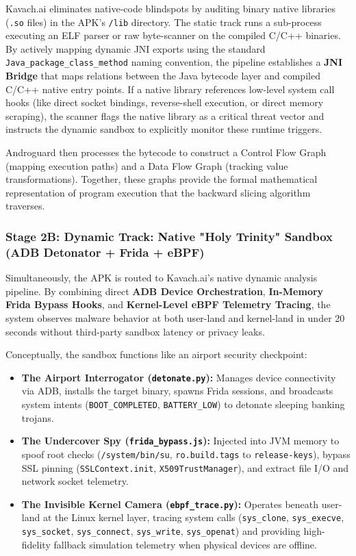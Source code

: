 \documentclass[10pt,a4paper]{article}
\begin{document}
Kavach.ai eliminates native-code blindspots by auditing binary native libraries (\texttt{.so} files) in the APK's \texttt{/lib} directory. The static track runs a sub-process executing an ELF parser or raw byte-scanner on the compiled C/C++ binaries. By actively mapping dynamic JNI exports using the standard \texttt{Java\_package\_class\_method} naming convention, the pipeline establishes a \textbf{JNI Bridge} that maps relations between the Java bytecode layer and compiled C/C++ native entry points. If a native library references low-level system call hooks (like direct socket bindings, reverse-shell execution, or direct memory scraping), the scanner flags the native library as a critical threat vector and instructs the dynamic sandbox to explicitly monitor these runtime triggers.

Androguard then processes the bytecode to construct a Control Flow Graph (mapping execution paths) and a Data Flow Graph (tracking value transformations). Together, these graphs provide the formal mathematical representation of program execution that the backward slicing algorithm traverses.

\subsubsection*{Stage 2B: Dynamic Track: Native "Holy Trinity" Sandbox (ADB Detonator + Frida + eBPF)}

Simultaneously, the APK is routed to Kavach.ai's native dynamic analysis pipeline. By combining direct \textbf{ADB Device Orchestration}, \textbf{In-Memory Frida Bypass Hooks}, and \textbf{Kernel-Level eBPF Telemetry Tracing}, the system observes malware behavior at both user-land and kernel-land in under 20 seconds without third-party sandbox latency or privacy leaks.

Conceptually, the sandbox functions like an airport security checkpoint:
\begin{itemize}
  \item \textbf{The Airport Interrogator (\texttt{detonate.py}):} Manages device connectivity via ADB, installs the target binary, spawns Frida sessions, and broadcasts system intents (\texttt{BOOT\_COMPLETED}, \texttt{BATTERY\_LOW}) to detonate sleeping banking trojans.
  \item \textbf{The Undercover Spy (\texttt{frida\_bypass.js}):} Injected into JVM memory to spoof root checks (\texttt{/system/bin/su}, \texttt{ro.build.tags} to \texttt{release-keys}), bypass SSL pinning (\texttt{SSLContext.init}, \texttt{X509TrustManager}), and extract file I/O and network socket telemetry.
  \item \textbf{The Invisible Kernel Camera (\texttt{ebpf\_trace.py}):} Operates beneath user-land at the Linux kernel layer, tracing system calls (\texttt{sys\_clone}, \texttt{sys\_execve}, \texttt{sys\_socket}, \texttt{sys\_connect}, \texttt{sys\_write}, \texttt{sys\_openat}) and providing high-fidelity fallback simulation telemetry when physical devices are offline.
\end{itemize}
\end{document}
